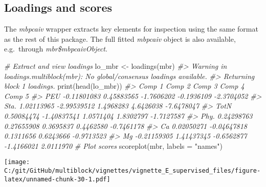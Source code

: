 \documentclass[
]{article}
\newenvironment{Shaded}{\begin{snugshade}}{\end{snugshade}}
\newcommand{\AttributeTok}[1]{\textcolor[rgb]{0.77,0.63,0.00}{#1}}
\newcommand{\CommentTok}[1]{\textcolor[rgb]{0.56,0.35,0.01}{\textit{#1}}}
\newcommand{\FunctionTok}[1]{\textcolor[rgb]{0.00,0.00,0.00}{#1}}
\newcommand{\NormalTok}[1]{#1}
\newcommand{\OtherTok}[1]{\textcolor[rgb]{0.56,0.35,0.01}{#1}}
\newcommand{\StringTok}[1]{\textcolor[rgb]{0.31,0.60,0.02}{#1}}
\begin{document}
\hypertarget{loadings-and-scores}{%
\subsection{Loadings and scores}\label{loadings-and-scores}}

The \emph{mbpcaiv} wrapper extracts key elements for inspection using
the same format as the rest of this package. The full fitted
\emph{mbpcaiv} object is also available, e.g.~through
\emph{mbr\$mbpcaivObject}.

\begin{Shaded}
\begin{Highlighting}[]
\CommentTok{\# Extract and view loadings}
\NormalTok{lo\_mbr }\OtherTok{\textless{}{-}} \FunctionTok{loadings}\NormalTok{(mbr)}
\CommentTok{\#\textgreater{} Warning in loadings.multiblock(mbr): No global/consensus loadings available.}
\CommentTok{\#\textgreater{} Returning block 1 loadings.}
\FunctionTok{print}\NormalTok{(}\FunctionTok{head}\NormalTok{(lo\_mbr))}
\CommentTok{\#\textgreater{}           Comp 1      Comp 2     Comp 3     Comp 4     Comp 5}
\CommentTok{\#\textgreater{} PEU  {-}0.11801083  0.45883565 {-}1.7606202 {-}0.1936109 {-}2.3704052}
\CommentTok{\#\textgreater{} Sta.  1.02113965 {-}2.99539512  1.4968283  4.6426038 {-}7.6478047}
\CommentTok{\#\textgreater{} TotN  0.50084474 {-}1.40837541  1.0571404  1.8302797 {-}1.7127587}
\CommentTok{\#\textgreater{} Phy.  0.24298763  0.27655908  0.3695837  0.4462580 {-}0.7461178}
\CommentTok{\#\textgreater{} Ca    0.02050271 {-}0.04647818  0.1311656  0.6243666 {-}0.9713523}
\CommentTok{\#\textgreater{} Mg   {-}0.21159305  1.41437345 {-}0.6562877 {-}1.4166021  2.0111970}
\CommentTok{\# Plot scores}
\FunctionTok{scoreplot}\NormalTok{(mbr, }\AttributeTok{labels =} \StringTok{"names"}\NormalTok{)}
\end{Highlighting}
\end{Shaded}

\texttt{[image: C:/git/GitHub/multiblock/vignettes/vignette\_E\_supervised\_files/figure-latex/unnamed-chunk-30-1.pdf]}
\end{document}
